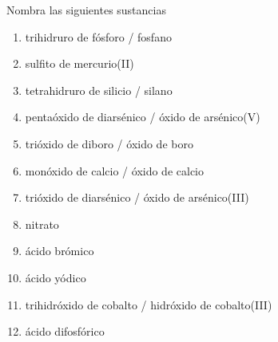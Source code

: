 \begin{exercise}[
    tags    = {inorgánica,nomenclatura,múltiple,2B},
    topics  = {química inorgánica,formulación,nomenclatura},
    source  = {Química 2B SAN 2016, p372, e8},
  ]
  Nombra las siguientes sustancias

  \begin{enumerate}\begin{multicols}{2}
    \item {}
    \item {}
    \item {}
    \item {}
    \item {}
    \item {}
    \item {}
    \item {}
    \item {}
    \item {}
    \item {}
    \item {}
  \end{multicols}\end{enumerate}
\end{exercise}

\begin{solution}
  \begin{enumerate}
    \item trihidruro de fósforo / fosfano
    \item sulfito de mercurio(II)
    \item tetrahidruro de silicio / silano
    \item pentaóxido de diarsénico / óxido de arsénico(V)
    \item trióxido de diboro / óxido de boro
    \item monóxido de calcio / óxido de calcio
    \item trióxido de diarsénico / óxido de arsénico(III)
    \item nitrato
    \item ácido brómico
    \item ácido yódico
    \item trihidróxido de cobalto / hidróxido de cobalto(III)
    \item ácido difosfórico
  \end{enumerate}
\end{solution}




